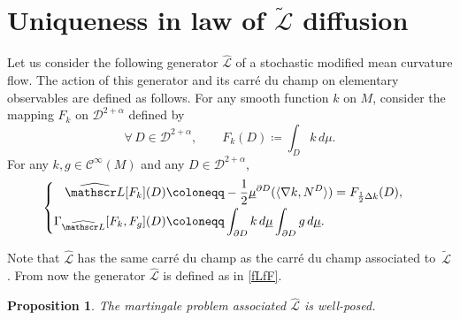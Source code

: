 \documentclass[10pt]{amsart}
\theoremstyle{plain}
\newtheorem{prop}[thm]{Proposition}
\theoremstyle{definition}
\newcommand{\SL}{{\mathscr L}}
\newcommand\df{\coloneqq}
\newcommand{\bq}{\begin{equation*}}
\newcommand{\bqq}[1]{\begin{equation}}
\newcommand{\eq}{\end{equation*}}
\newcommand{\eqn}{\end{equation}}
\newcommand{\fo}{\forall\,}
\newcommand{\usm}{{\underline{\smash{\mu}}}}
\let\f\frac
\let\D\Delta
\let\n\nabla
\let\pa\partial
\let\wi\widetilde
\let\iy\infty
\newcommand{\cC}{\mathcal{C}}
\newcommand{\cD}{\mathcal{D}}
\begin{document}
\section{Uniqueness in law of \texorpdfstring{$\tilde{\mathcal{L}}$}{L} diffusion}\label{AppendixG}

Let us consider the following generator $\widehat{\SL}$ of a stochastic modified mean curvature flow. The action of this generator and its carré du champ on elementary observables are defined as follows.
For any smooth function $k$ on $M$, consider the mapping $F_k$ on $\cD^{2+\alpha}$ defined by
\bq
\fo D\in \cD^{2+\alpha},\qquad F_k(D)\df \int_D k\, d\mu.\eq
For any $k,g\in \cC^\iy(M)$ and any $D\in \cD^{2+\alpha}$,
\bqq{G.6.7}
\begin{cases}
\begin{aligned}
\widehat{\SL}[F_k](D)&\df -\f12 \usm^{\partial D}(\langle \n k, N^D\rangle )= F_{\frac12 \D k} (D),\\
\Gamma_{\widehat{\SL}}[F_k, F_g](D)&\df \int_{\pa D} k\, d\usm\int_{\pa D} g\, d\usm.
\end{aligned}
\end{cases}
\eqn\par
Note that $\widehat{\SL} $ has the same carré du champ as the carré du champ associated to~$\wi\SL $.
From now the generator $\widehat{\SL} $ is defined as in \eqref{fLfF}.
\begin{prop}\label{prop-G1} The martingale problem associated $\widehat{\SL}$ is well-posed.
\end{prop}
\end{document}
